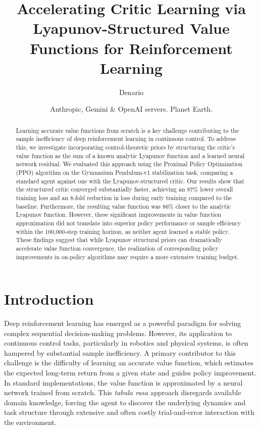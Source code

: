 \documentclass[]{article}
\begin{document}
\title{Accelerating Critic Learning via Lyapunov-Structured Value Functions for Reinforcement Learning}

\author{Denario}
\date{Anthropic, Gemini \& OpenAI servers. Planet Earth.}

\maketitle
\begin{abstract}
Learning accurate value functions from scratch is a key challenge contributing to the sample inefficiency of deep reinforcement learning in continuous control. To address this, we investigate incorporating control-theoretic priors by structuring the critic's value function as the sum of a known analytic Lyapunov function and a learned neural network residual. We evaluated this approach using the Proximal Policy Optimization (PPO) algorithm on the Gymnasium Pendulum-v1 stabilization task, comparing a standard agent against one with the Lyapunov-structured critic. Our results show that the structured critic converged substantially faster, achieving an 87\% lower overall training loss and an 8-fold reduction in loss during early training compared to the baseline. Furthermore, the resulting value function was 86\% closer to the analytic Lyapunov function. However, these significant improvements in value function approximation did not translate into superior policy performance or sample efficiency within the 100,000-step training horizon, as neither agent learned a stable policy. These findings suggest that while Lyapunov structural priors can dramatically accelerate value function convergence, the realization of corresponding policy improvements in on-policy algorithms may require a more extensive training budget.
\end{abstract}








\section{Introduction}
\label{sec:intro}
Deep reinforcement learning has emerged as a powerful paradigm for solving complex sequential decision-making problems. However, its application to continuous control tasks, particularly in robotics and physical systems, is often hampered by substantial sample inefficiency. A primary contributor to this challenge is the difficulty of learning an accurate value function, which estimates the expected long-term return from a given state and guides policy improvement. In standard implementations, the value function is approximated by a neural network trained from scratch. This \textit{tabula rasa} approach disregards available domain knowledge, forcing the agent to discover the underlying dynamics and task structure through extensive and often costly trial-and-error interaction with the environment.
\end{document}
